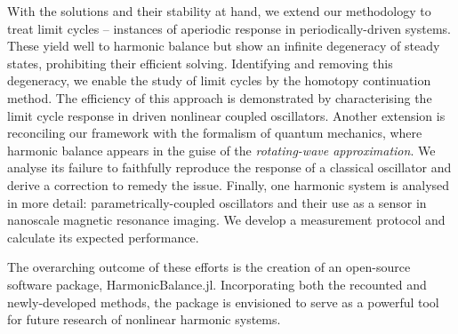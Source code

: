 With the solutions and their stability at hand, we extend our methodology to treat limit cycles – instances of aperiodic response in periodically-driven systems. These yield well to harmonic balance but show an infinite degeneracy of steady states, prohibiting their efficient solving. Identifying and removing this degeneracy, we enable the study of limit cycles by the homotopy continuation method. The efficiency of this approach is demonstrated by characterising the limit cycle response in driven nonlinear coupled oscillators. Another extension is reconciling our framework with the formalism of quantum mechanics, where harmonic balance appears in the guise of the \textit{rotating-wave approximation}. We analyse its failure to faithfully reproduce the response of a classical oscillator and derive a correction to remedy the issue. Finally, one harmonic system is analysed in more detail: parametrically-coupled oscillators and their use as a sensor in nanoscale magnetic resonance imaging. We develop a measurement protocol and calculate its expected performance.

The overarching outcome of these efforts is the creation of an open-source software package, HarmonicBalance.jl. Incorporating both the recounted and newly-developed methods, the package is envisioned to serve as a powerful tool for future research of nonlinear harmonic systems. 

 

 